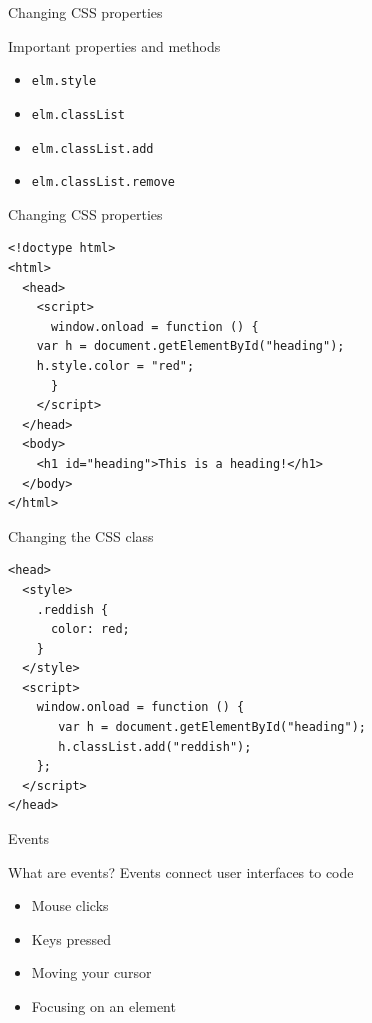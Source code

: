 \documentclass{beamer}
\begin{document}

\begin{frame}[fragile]{Changing CSS properties}
  \begin{block}{Important properties and methods}
    \begin{itemize}
      \item<1,2> \texttt{elm.style}
      \item<1,3> \texttt{elm.classList}
      \item<1,4> \texttt{elm.classList.add}
      \item<1,5> \texttt{elm.classList.remove}
    \end{itemize}
  \end{block}
\end{frame}

\begin{frame}[fragile]{Changing CSS properties}
 \begin{block}{}
\begin{verbatim}
<!doctype html>
<html>
  <head>
    <script>
      window.onload = function () {
	var h = document.getElementById("heading");
	h.style.color = "red";
      }
    </script>
  </head>
  <body>
    <h1 id="heading">This is a heading!</h1>
  </body>
</html>
\end{verbatim}
\end{block}
\end{frame}

\begin{frame}[fragile,label={sec:orgheadline55}]{Changing the CSS class}
 \begin{block}{}
\begin{verbatim}
<head>
  <style>
    .reddish {
      color: red;
    }
  </style>
  <script>
    window.onload = function () {
       var h = document.getElementById("heading");
       h.classList.add("reddish");
    };
  </script>
</head>
\end{verbatim}
\end{block}
\end{frame}

\begin{frame}{Events}
\begin{block}{What are events?}
Events connect user interfaces to code
\begin{itemize}
  \item<1,2>Mouse clicks
  \item<1,3>Keys pressed
  \item<1,4>Moving your cursor
  \item<1,5>Focusing on an element
\end{itemize}
\end{block}
\end{frame}
\end{document}
